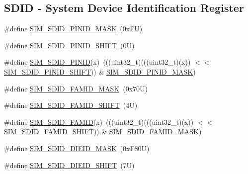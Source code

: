 \subsection*{S\+D\+ID -\/ System Device Identification Register}
\begin{DoxyCompactItemize}
\item 
\#define \mbox{\hyperlink{group___s_i_m___register___masks_gaf0820acb74ce8270da2025fee624b47c}{S\+I\+M\+\_\+\+S\+D\+I\+D\+\_\+\+P\+I\+N\+I\+D\+\_\+\+M\+A\+SK}}~(0x\+F\+U)
\item 
\#define \mbox{\hyperlink{group___s_i_m___register___masks_ga593faac0d0629fde52f6fe4b83614c23}{S\+I\+M\+\_\+\+S\+D\+I\+D\+\_\+\+P\+I\+N\+I\+D\+\_\+\+S\+H\+I\+FT}}~(0\+U)
\item 
\#define \mbox{\hyperlink{group___s_i_m___register___masks_ga64447ab3209ba3103c4d452b56c405a1}{S\+I\+M\+\_\+\+S\+D\+I\+D\+\_\+\+P\+I\+N\+ID}}(x)~(((uint32\+\_\+t)(((uint32\+\_\+t)(x)) $<$$<$ \mbox{\hyperlink{group___s_i_m___register___masks_ga593faac0d0629fde52f6fe4b83614c23}{S\+I\+M\+\_\+\+S\+D\+I\+D\+\_\+\+P\+I\+N\+I\+D\+\_\+\+S\+H\+I\+FT}})) \& \mbox{\hyperlink{group___s_i_m___register___masks_gaf0820acb74ce8270da2025fee624b47c}{S\+I\+M\+\_\+\+S\+D\+I\+D\+\_\+\+P\+I\+N\+I\+D\+\_\+\+M\+A\+SK}})
\item 
\#define \mbox{\hyperlink{group___s_i_m___register___masks_ga5344e7283b2aead14d9d3bded0114f3b}{S\+I\+M\+\_\+\+S\+D\+I\+D\+\_\+\+F\+A\+M\+I\+D\+\_\+\+M\+A\+SK}}~(0x70\+U)
\item 
\#define \mbox{\hyperlink{group___s_i_m___register___masks_ga377bc761e6ee1caab79baad3e2d0d331}{S\+I\+M\+\_\+\+S\+D\+I\+D\+\_\+\+F\+A\+M\+I\+D\+\_\+\+S\+H\+I\+FT}}~(4\+U)
\item 
\#define \mbox{\hyperlink{group___s_i_m___register___masks_gad745ac0cdf951b6e7a8fd2f3e133d961}{S\+I\+M\+\_\+\+S\+D\+I\+D\+\_\+\+F\+A\+M\+ID}}(x)~(((uint32\+\_\+t)(((uint32\+\_\+t)(x)) $<$$<$ \mbox{\hyperlink{group___s_i_m___register___masks_ga377bc761e6ee1caab79baad3e2d0d331}{S\+I\+M\+\_\+\+S\+D\+I\+D\+\_\+\+F\+A\+M\+I\+D\+\_\+\+S\+H\+I\+FT}})) \& \mbox{\hyperlink{group___s_i_m___register___masks_ga5344e7283b2aead14d9d3bded0114f3b}{S\+I\+M\+\_\+\+S\+D\+I\+D\+\_\+\+F\+A\+M\+I\+D\+\_\+\+M\+A\+SK}})
\item 
\#define \mbox{\hyperlink{group___s_i_m___register___masks_ga8b02a91f9dd18064e4fc83575cfb117e}{S\+I\+M\+\_\+\+S\+D\+I\+D\+\_\+\+D\+I\+E\+I\+D\+\_\+\+M\+A\+SK}}~(0x\+F80\+U)
\item 
\#define \mbox{\hyperlink{group___s_i_m___register___masks_gaedeb2d58c67fcc1e588f224527ac623b}{S\+I\+M\+\_\+\+S\+D\+I\+D\+\_\+\+D\+I\+E\+I\+D\+\_\+\+S\+H\+I\+FT}}~(7\+U)

\end{DoxyCompactItemize}
